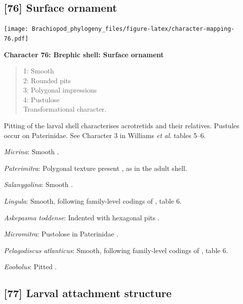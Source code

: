 \documentclass[openany]{book}
\theoremstyle{definition}
\theoremstyle{definition}
\theoremstyle{definition}
\theoremstyle{remark}
\begin{document}
\hypertarget{surface-ornament}{%
\subsection*{{[}76{]} Surface ornament}\label{surface-ornament}}

\texttt{[image: Brachiopod\_phylogeny\_files/figure-latex/character-mapping-76.pdf]}

\textbf{Character 76: Brephic shell: Surface ornament}

\begin{quote}
1: Smooth\\
2: Rounded pits\\
3: Polygonal impressions\\
4: Pustulose\\
Transformational character.
\end{quote}

Pitting of the larval shell characterises acrotretids and their
relatives. Pustules occur on Paterinidae. See Character 3 in Williams
\emph{et al}. \citeyearpar{Williams2000BrachiopodaLinguliformea} tables
5--6.

\emph{Micrina}: Smooth \citep{Holmer2011Firstrecord}.

\emph{Paterimitra}: Polygonal texture present
\citep{Holmer2011Firstrecord}, as in the adult shell.

\emph{Salanygolina}: Smooth \citep{Holmer2009Theenigmatic}.

\emph{Lingula}: Smooth, following family-level codings of
\citet{Williams2000BrachiopodaLinguliformea}, table 6.

\emph{Askepasma toddense}: Indented with hexagonal pits \citep[appendix
2]{Williams1998Thediversity}.

\emph{Micromitra}: Pustolose in Paterinidae \citep[table
6]{Williams2000BrachiopodaLinguliformea}.

\emph{Pelagodiscus atlanticus}: Smooth, following family-level codings
of \citet{Williams2000BrachiopodaLinguliformea}, table 6.

\emph{Eoobolus}: Pitted \citep[table
8]{Williams2000BrachiopodaLinguliformea}.

\hypertarget{larval-attachment-structure}{%
\subsection*{{[}77{]} Larval attachment
structure}\label{larval-attachment-structure}}
\end{document}
